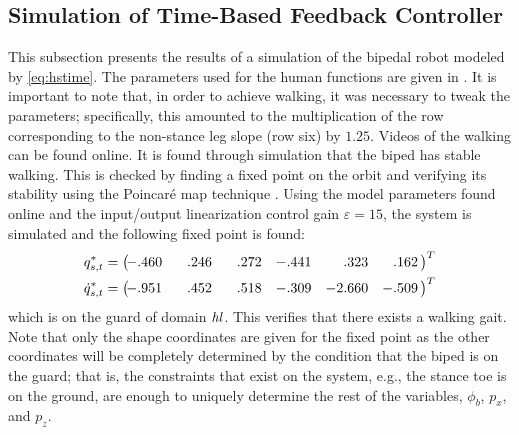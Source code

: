 \subsection{Simulation of Time-Based Feedback Controller} \label{sec:timesim} \noindent
This subsection presents the results of a simulation of the bipedal robot
modeled by \eqref{eq:hstime}. The parameters used for the human functions are
given in . It is important to note that, in order to
achieve walking, it was necessary to tweak the parameters; specifically, this
amounted to the multiplication of the row corresponding to the non-stance leg
slope (row six) by $1.25$. Videos of the walking can be found
online.\cite{url:robotica_2011_spja_01}\xspace It is found through simulation
that the biped has stable walking. This is checked by finding a fixed point on
the orbit and verifying its stability using the Poincar\'{e} map technique
\cite{Parker1989}. Using the model parameters found
online\cite{url:robotica_2011_spja_01}\xspace and the input/output linearization
control gain $\varepsilon = 15$, the system is simulated and the following fixed
point is found:
\begin{align}
  q_{s,t}^{*} =
  \left(\!\!\!\!\begin{array}{c c c c c c}
    -.460 & \hphantom{-}.246 & \hphantom{-}.272 & -.441 & \hphantom{-0}.323 & \hphantom{-}.162
  \end{array}\!\!\right)^T\\
  {\dot q}_{s,t}^{*} =
  \left(\!\!\!\!\begin{array}{c c c c c c}
    -.951 & \hphantom{-}.452 & \hphantom{-}.518 & -.309 & -2.660 & -.509
  \end{array}\!\!\right)^T
\end{align}
which is on the guard of domain $\mathit{hl}$. This verifies that there exists a walking gait. Note that only the shape coordinates are given for the fixed point as the other coordinates will be completely determined by the condition that the biped is on the guard; that is, the constraints that exist on the system, e.g., the stance toe is on the ground, are enough to uniquely determine the rest of the variables, $\phi_b$, $p_x$, and $p_z$.

